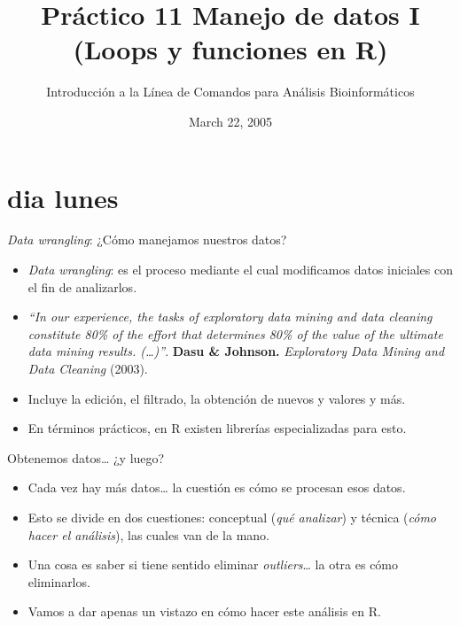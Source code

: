 \documentclass[ignorenonframetext,]{beamer}
\title{Práctico 11 Manejo de datos I (Loops y funciones en R)}
\author{Introducción a la Línea de Comandos para Análisis Bioinformáticos}
\date{March 22, 2005}
\providecommand{\tightlist}{%
  \setlength{\itemsep}{0pt}\setlength{\parskip}{0pt}}
\begin{document}
\frame{\titlepage}

\hypertarget{dia-lunes}{%
\section{dia lunes}\label{dia-lunes}}

\begin{frame}{\emph{Data wrangling}: ¿Cómo manejamos nuestros datos?}
\protect\hypertarget{data-wrangling-cuxf3mo-manejamos-nuestros-datos}{}

\begin{itemize}
\tightlist
\item
  \emph{Data wrangling}: es el proceso mediante el cual modificamos
  datos iniciales con el fin de analizarlos.
\item
  \emph{``In our experience, the tasks of exploratory data mining and
  data cleaning constitute 80\% of the effort that determines 80\% of
  the value of the ultimate data mining results. (\ldots{})''}.
  \textbf{Dasu \& Johnson.} \emph{Exploratory Data Mining and Data
  Cleaning} (2003).
\item
  Incluye la edición, el filtrado, la obtención de nuevos y valores y
  más.
\item
  En términos prácticos, en R existen librerías especializadas para
  esto.
\end{itemize}

\end{frame}

\begin{frame}{Obtenemos datos\ldots{} ¿y luego?}
\protect\hypertarget{obtenemos-datos-y-luego}{}

\begin{itemize}
\tightlist
\item
  Cada vez hay más datos\ldots{} la cuestión es cómo se procesan esos
  datos.
\item
  Esto se divide en dos cuestiones: conceptual (\emph{qué analizar}) y
  técnica (\emph{cómo hacer el análisis}), las cuales van de la mano.
\item
  Una cosa es saber si tiene sentido eliminar \emph{outliers}\ldots{} la
  otra es cómo eliminarlos.
\item
  Vamos a dar apenas un vistazo en cómo hacer este análisis en R.
\end{itemize}

\end{frame}
\end{document}

